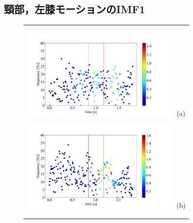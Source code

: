 \subsection{頸部，左膝モーションのIMF1}
\begin{figure}
    \begin{center}
        \begin{tabular}{c}
            \begin{minipage}{0.5\hsize}
                \begin{center}
                    \includegraphics[width=8cm]{./images/straight_data/neck/IMF1.png}
                    (a)
                    \label{straight neck imf1}
                \end{center}
            \end{minipage}

            \begin{minipage}{0.5\hsize}
                \begin{center}
                    \includegraphics[width=8cm]{./images/straight_data/left_leg/IMF1.png}
                    (b)
                    \label{straight left leg imf1}
                \end{center}
            \end{minipage}
        \end{tabular}
    \end{center}


\end{figure}
